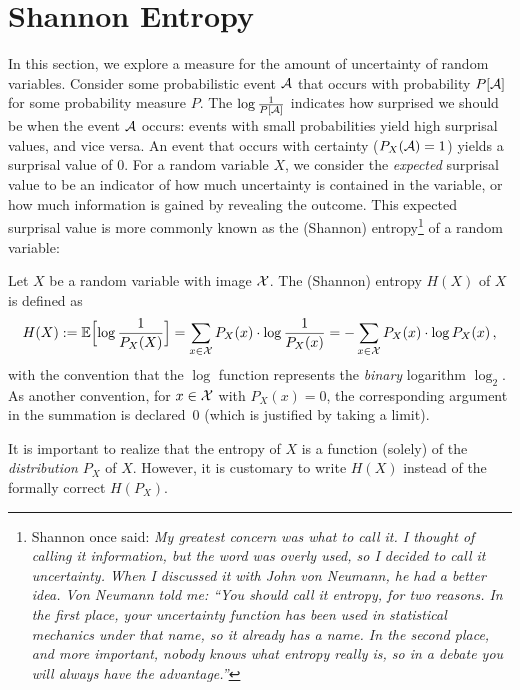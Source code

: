 \section{Shannon Entropy}
In this section, we explore a measure for the amount of uncertainty of random variables. Consider some probabilistic event $\mathcal{A}$ that occurs with probability $P[\mathcal{A}]$ for some probability measure $P$. The  $\log \frac{1}{P[\mathcal{A}]}$ indicates how surprised we should be when the event $\mathcal{A}$ occurs: events with small probabilities yield high surprisal values, and vice versa. An event that occurs with certainty ($P_X(\mathcal{A}) = 1$) yields a surprisal value of 0. For a random variable $X$, we consider the {\em expected} surprisal value to be an indicator of how much uncertainty is contained in the variable, or how much information is gained by revealing the outcome. This expected surprisal value is more commonly known as the (Shannon) entropy\footnote{Shannon once said: \it My greatest concern was what to call it. I thought of calling it {\em information}, but the word was overly used, so I decided to call it {\em uncertainty}. When I discussed it with John von Neumann, he had a better idea. Von Neumann told me: ``You should call it {\em entropy}, for two reasons. In the first place, your uncertainty function has been used in statistical mechanics under that name, so it already has a name. In the second place, and more important, nobody knows what entropy really is, so in a debate you will always have the advantage.''  } of a random variable:

\begin{definition}[Entropy]\label{def:entropy}
Let $X$ be a random variable with image ${\cal X}$. The
(Shannon) entropy $H(X)$ of $X$ is defined as
\[
H(X) := \mathbb{E}\Bigl[\log\frac{1}{P_X(X)}\Bigr] = \sum_{x\in {\cal X}} P_X(x) \cdot \log \frac{1}{P_X(x)} = -\sum_{x\in {\cal X}} P_X(x) \cdot \log P_X(x) \, ,
\]
with the convention that the $\log$ function represents the {\em binary} logarithm $\log_2$. As another convention, for $x \in  \cal X$ with $P_X(x) = 0$, the corresponding argument in the summation is declared~$0$ (which is justified by
taking a limit).%
\end{definition}
%
It is important to realize that the entropy of $X$ is a function (solely) of the {\em distribution} $P_X$ of $X$. However, it is customary to write $H(X)$ instead of the formally correct $H(P_X)$. 


